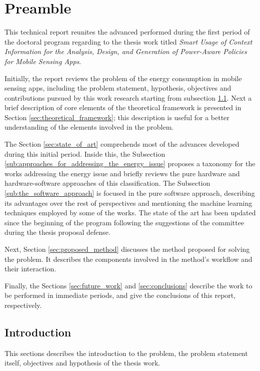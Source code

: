 \section{Preamble}
\label{sec:preamble}
This technical report reunites the advanced performed during the first period of the doctoral program regarding to the thesis work titled \emph{Smart Usage of Context Information for the Analysis, Design, and Generation of Power-Aware Policies for Mobile Sensing Apps}.

Initially, the report reviews the problem of the energy consumption in mobile sensing apps, including the problem statement, hypothesis, objectives and contributions pursued by this work research starting from subsection \ref{sub:introduction}.
Next a brief description of core elements of the theoretical framework is presented in Section \ref{sec:theoretical_framework}; this description is useful for a better understanding of the elements involved in the problem.

The Section \ref{sec:state_of_art} comprehends most of the advances developed during this initial period. Inside this, the Subsection \ref{sub:approaches_for_addressing_the_energy_issue} proposes a taxonomy for the works addressing the energy issue and briefly reviews the pure hardware and hardware-software approaches of this classification. The Subsection \ref{sub:the_software_approach} is focused in the pure software approach, describing its advantages over the rest of perspectives and mentioning the machine learning techniques employed by some of the works. The state of the art has been updated since the beginning of the program following the suggestions of the committee during the thesis proposal defense.

Next, Section \ref{sec:proposed_method} discusses the method proposed for solving the problem.
It describes the components involved in the method's workflow and their interaction.

Finally, the Sections \ref{sec:future_work} and \ref{sec:conclusions} describe the work to be performed in immediate periods, and give the conclusions of this report, respectively.

\subsection{Introduction}
\label{sub:introduction}
This sections describes the introduction to the problem, the problem statement itself, objectives and hypothesis of the thesis work.

